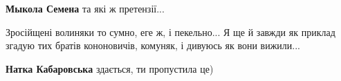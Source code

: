 \begin{itemize}
\begin{itemize}
 
\textbf{Мыкола Семена} та які ж претензії...
\end{itemize}

 

Зросійщені волиняки то сумно, еге ж, і пекельно... Я ще й завжди як приклад
згадую тих братів кононовичів, комуняк, і дивуюсь як вони вижили...


 
\textbf{Натка Кабаровська} здається, ти пропустила це)


\end{itemize}


